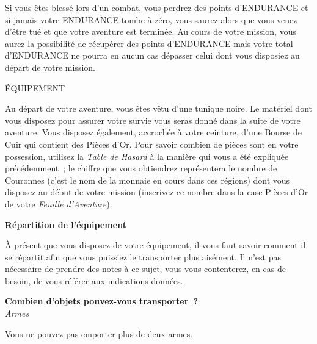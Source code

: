 \documentclass[11pt]{book}
\begin{document}
Si vous êtes blessé lors d'un combat, vous perdrez des points d'ENDURANCE et si
jamais votre ENDURANCE tombe à zéro, vous saurez alors que vous venez d'être tué et
que votre aventure est terminée. Au cours de votre mission, vous aurez la possibilité
de récupérer des points d'ENDURANCE mais votre total d'ENDURANCE ne pourra en aucun
cas dépasser celui dont vous disposiez au départ de votre mission.


\begin{center}
  ÉQUIPEMENT
\end{center}

Au départ de votre aventure, vous êtes vêtu d'une tunique noire. Le matériel
dont vous disposez pour assurer votre survie vous seras donné dans la suite de
votre aventure. Vous disposez également, accrochée à votre ceinture, d'une Bourse
de Cuir qui contient des Pièces d'Or. Pour savoir combien de pièces sont en votre possession,
utilisez la \textit{Table de Hasard} à la manière qui vous a été expliquée précédemment~;
le chiffre que vous obtiendrez représentera le nombre de Couronnes (c'est le nom de la monnaie
en cours dans ces régions) dont vous disposez au début de votre mission (inscrivez ce nombre
dans la case Pièces d'Or de votre \textit{Feuille d'Aventure}).\\

\begin{center}
  \textbf{Répartition de l'équipement}
\end{center}

À présent que vous disposez de votre équipement, il vous faut savoir comment il se
répartit afin que vous puissiez le transporter plus aisément. Il n'est pas nécessaire
de prendre des notes à ce sujet, vous vous contenterez, en cas de besoin, de vous référer
aux indications données.

\begin{center}
  \textbf{Combien d'objets pouvez-vous transporter~?}\\
  \textit{Armes}
\end{center}
Vous ne pouvez pas emporter plus de deux armes.
\end{document}
